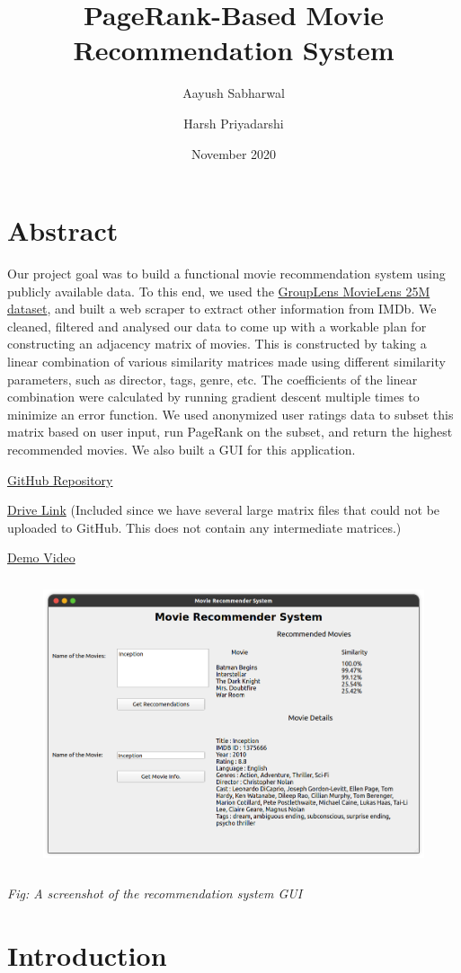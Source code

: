 \documentclass[11pt]{article}
\title{PageRank-Based Movie Recommendation System}
\author{
        Aayush Sabharwal
        \and
        Harsh Priyadarshi
    }
\date{November 2020}
\begin{document}
    
    \maketitle
    
    

    
    \hypertarget{abstract}{%
\section{Abstract}\label{abstract}}

Our project goal was to build a functional movie recommendation system
using publicly available data. To this end, we used the
\href{https://grouplens.org/datasets/movielens/}{GroupLens MovieLens 25M
dataset}, and built a web scraper to extract other information from
IMDb. We cleaned, filtered and analysed our data to come up with a
workable plan for constructing an adjacency matrix of movies. This is
constructed by taking a linear combination of various similarity
matrices made using different similarity parameters, such as director,
tags, genre, etc. The coefficients of the linear combination were
calculated by running gradient descent multiple times to minimize an
error function. We used anonymized user ratings data to subset this
matrix based on user input, run PageRank on the subset, and return the
highest recommended movies. We also built a GUI for this application.

\href{https://github.com/AayushSabharwal/recommender-system}{GitHub
Repository}

\href{https://drive.google.com/file/d/1e2L14HxKfuI4LJUIBTAo6CSgmtm1x7se/view?usp=sharing}{Drive
Link} (Included since we have several large matrix files that could not
be uploaded to GitHub. This does not contain any intermediate matrices.)

\href{https://youtu.be/CDz3vVZKoCM}{Demo Video}

\begin{figure}
    \centering
    \includegraphics[height=8.5cm]{gui.png}
\end{figure}
\begin{center}
    \textit{Fig: A screenshot of the recommendation system GUI}
\end{center}
    \hypertarget{introduction}{%
\section{Introduction}\label{introduction}}
\end{document}

